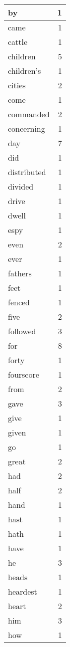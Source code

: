 \begin{center}
\begin{longtable}{l|r}
by & 1\\ \hline 
came & 1\\ \hline 
cattle & 1\\ \hline 
children & 5\\ \hline 
children's & 1\\ \hline 
cities & 2\\ \hline 
come & 1\\ \hline 
commanded & 2\\ \hline 
concerning & 1\\ \hline 
day & 7\\ \hline 
did & 1\\ \hline 
distributed & 1\\ \hline 
divided & 1\\ \hline 
drive & 1\\ \hline 
dwell & 1\\ \hline 
espy & 1\\ \hline 
even & 2\\ \hline 
ever & 1\\ \hline 
fathers & 1\\ \hline 
feet & 1\\ \hline 
fenced & 1\\ \hline 
five & 2\\ \hline 
followed & 3\\ \hline 
for & 8\\ \hline 
forty & 1\\ \hline 
fourscore & 1\\ \hline 
from & 2\\ \hline 
gave & 3\\ \hline 
give & 1\\ \hline 
given & 1\\ \hline 
go & 1\\ \hline 
great & 2\\ \hline 
had & 2\\ \hline 
half & 2\\ \hline 
hand & 1\\ \hline 
hast & 1\\ \hline 
hath & 1\\ \hline 
have & 1\\ \hline 
he & 3\\ \hline 
heads & 1\\ \hline 
heardest & 1\\ \hline 
heart & 2\\ \hline 
him & 3\\ \hline 
how & 1\\ \hline 

\end{longtable}
\end{center}
